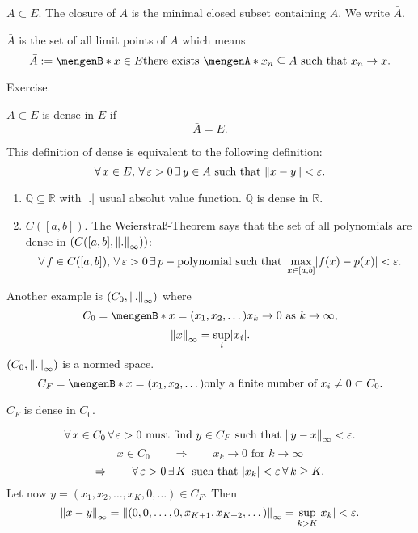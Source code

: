 \begin{definition*}[closure]
	$A \subset E$. The closure of $A$ is the minimal closed subset containing $A$. We write $\bar{A}$.
\end{definition*}
\begin{proposition}
	$\bar{A}$ is the set of all limit points of $A$ which means
	\[
		\bar{A} := \set[x \in E]{\text{there exists $\set{x_n} \subseteq A$ such that $x_n \to x$}}.
	\]
\end{proposition}
\begin{beweis}
	Exercise.
\end{beweis}
\begin{definition*}[dense]
	$A \subset E$ is dense in $E$ if 
	\[
		\bar{A} = E.
	\]
\end{definition*}
\begin{bemerkung}
	This definition of dense is equivalent to the following definition:
	\[
		\forall\, x \in E,\,\forall\, \varepsilon>0 \,\exists\,y \in A \text{ such that } \norm{x-y} < \varepsilon.
	\]
\end{bemerkung}
\begin{beispiele}
	\begin{enumerate}[1)]
		\item $\mathbb{Q} \subseteq \mathbb{R}$ with $\lvert.\rvert$ usual absolut value function. $\mathbb{Q}$ is dense in $\mathbb{R}$.
		\item $C([a,b])$. The \underline{Weierstraß-Theorem} says that the set of all polynomials are dense in $(C([a,b],\norm{.}_{\infty}))$:
		\[
			\forall\, f \in C([a,b]),\,\forall\, \varepsilon>0 \,\exists\,p-\text{polynomial such that }\max_{x \in [a,b]}\lvert f(x)-p(x)\rvert < \varepsilon.
		\]
	\end{enumerate}
\end{beispiele}
Another example is $(C_0, \norm{.}_{\infty})$ where
		\[
			C_0 = \set[x = (x_1,x_2,\dots)]{x_k \to 0 \text{ as }k \to \infty},
		\]
		\[
			\norm{x}_{\infty}= \sup_{i}\abs{x_i}.
		\]
		$(C_0,\norm{.}_{\infty})$ is a normed space. 
		\[
			C_F = \set[x = (x_1,x_2,\dots)]{\text{only a finite number of }x_i \neq 0} \subset C_0.
		\]
\begin{satz}
	$C_F$ is dense in $C_0$.
\end{satz}
\begin{beweis}
	\[
		\forall\,  x \in C_0 \,\forall\, \varepsilon>0 \text{ must find }y \in C_F \text{ such that }\norm{y-x}_{\infty} < \varepsilon.
	\]
	\[
		x \in C_0 \qquad \Rightarrow \qquad x_k \to 0 \text{ for }k \to \infty 
	\]
	\[
		\Rightarrow \qquad \forall\, \varepsilon >0 \,\exists\,K \,\text{ such that } \lvert x_k\rvert < \varepsilon \, \forall\, k \geq K.
	\]
	Let now $y = (x_1,x_2, \dots,x_K, 0, \dots) \in C_F$. Then 
	\[
		\norm{x-y}_{\infty} = \norm{(0,0,\dots,0,x_{K+1},x_{K+2},\dots)}_{\infty} = \sup_{k >K}\abs{x_k} < \varepsilon.
	\]
\end{beweis}
